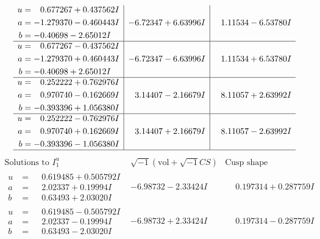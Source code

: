 \documentclass[1p]{elsarticle_modified}
\theoremstyle{definition}
\newcommand{\I}{\sqrt{-1}}
\begin{document}
$$\begin{array}{c|c|c}
\begin{aligned}
u &= \phantom{-}0.677267 + 0.437562 I \\
a &= -1.279370 - 0.460443 I \\
b &= -0.40698 - 2.65012 I\end{aligned}
 & -6.72347 + 6.63996 I & \phantom{-}1.11534 - 6.53780 I \\ \hline\begin{aligned}
u &= \phantom{-}0.677267 - 0.437562 I \\
a &= -1.279370 + 0.460443 I \\
b &= -0.40698 + 2.65012 I\end{aligned}
 & -6.72347 - 6.63996 I & \phantom{-}1.11534 + 6.53780 I \\ \hline\begin{aligned}
u &= \phantom{-}0.252222 + 0.762976 I \\
a &= \phantom{-}0.970740 - 0.162669 I \\
b &= -0.393396 + 1.056380 I\end{aligned}
 & \phantom{-}3.14407 - 2.16679 I & \phantom{-}8.11057 + 2.63992 I \\ \hline\begin{aligned}
u &= \phantom{-}0.252222 - 0.762976 I \\
a &= \phantom{-}0.970740 + 0.162669 I \\
b &= -0.393396 - 1.056380 I\end{aligned}
 & \phantom{-}3.14407 + 2.16679 I & \phantom{-}8.11057 - 2.63992 I\\
 \hline 
 \end{array}$$\newpage$$\begin{array}{c|c|c}  
\text{Solutions to }I^u_{1}& \I (\text{vol} + \sqrt{-1}CS) & \text{Cusp shape}\\
 \hline 
\begin{aligned}
u &= \phantom{-}0.619485 + 0.505792 I \\
a &= \phantom{-}2.02337 + 0.19994 I \\
b &= \phantom{-}0.63493 + 2.03020 I\end{aligned}
 & -6.98732 - 2.33424 I & \phantom{-}0.197314 + 0.287759 I \\ \hline\begin{aligned}
u &= \phantom{-}0.619485 - 0.505792 I \\
a &= \phantom{-}2.02337 - 0.19994 I \\
b &= \phantom{-}0.63493 - 2.03020 I\end{aligned}
 & -6.98732 + 2.33424 I & \phantom{-}0.197314 - 0.287759 I \\ \hline\begin{aligned}

\end{aligned}
\end{array}$$
\end{document}

